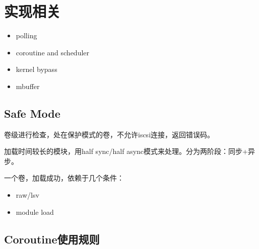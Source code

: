 \chapter{实现相关}

\begin{itemize}
    \item polling
    \item coroutine and scheduler
    \item kernel bypass
    \item mbuffer
\end{itemize}

\section{Safe Mode}

卷级进行检查，处在保护模式的卷，不允许iscsi连接，返回错误码。

加载时间较长的模块，用half sync/half async模式来处理。分为两阶段：同步+异步。

一个卷，加载成功，依赖于几个条件：
\begin{itemize}
    \item raw/lsv
    \item module load
\end{itemize}

\section{Coroutine使用规则}



